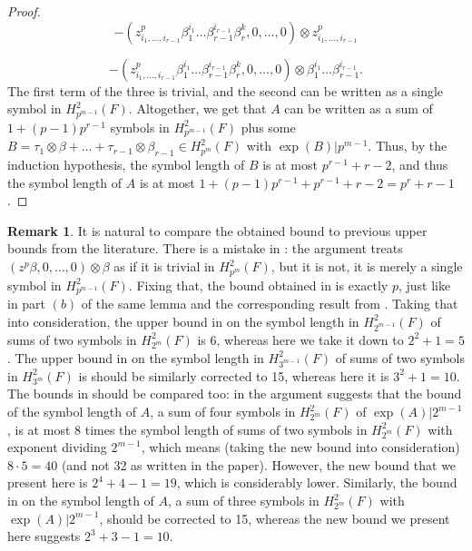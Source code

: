 \documentclass[preprint, 10pt, english]{elsarticle}
\theoremstyle{definition}
\newtheorem{rem}[thm]{Remark}
\begin{document}
\begin{proof}
$$-(z_{i_1,\dots,i_{r-1}}^p \beta_1^{i_1} \dots \beta_{r-1}^{i_{r-1}} \beta_r^k,0,\dots,0)\otimes z_{i_1,\dots,i_{r-1}}^p$$

$$-(z_{i_1,\dots,i_{r-1}}^p \beta_1^{i_1} \dots \beta_{r-1}^{i_{r-1}} \beta_r^k,0,\dots,0)\otimes \beta_1^{i_1} \dots \beta_{r-1}^{i_{r-1}}.$$
The first term of the three is trivial, and the second can be written as a single symbol in $H_{p^{m-1}}^2(F)$.
Altogether, we get that $A$ can be written as a sum of $1+(p-1)p^{r-1}$ symbols in $H_{p^{m-1}}^2(F)$ plus some  $B=\tau_1\otimes\beta+\dots+\tau_{r-1}\otimes\beta_{r-1} \in H_{p^m}^2(F)$ with $\exp(B)|p^{m-1}$. Thus, by the induction hypothesis, the symbol length of $B$ is at most $p^{r-1}+r-2$, and thus the symbol length of $A$ is at most $1+(p-1)p^{r-1}+p^{r-1}+r-2=p^r+r-1$.
\end{proof}

\begin{rem}
It is natural to compare the obtained bound to previous upper bounds from the literature. There is a mistake in \cite[Lemma 5.4 (a)]{ChapmanFlorenceMcKinnie:2023}: the argument treats $(z^p \beta,0,\dots,0)\otimes \beta$ as if it is trivial in $H_{p^m}^2(F)$, but it is not, it is merely a single symbol in $H_{p^{m-1}}^2(F)$. Fixing that, the bound obtained in \cite[Lemma 5.4 (a)]{ChapmanFlorenceMcKinnie:2023} is exactly $p$, just like in part $(b)$ of the same lemma and the corresponding result from \cite{MammoneMerkurjev:1991}. Taking that into consideration, the upper bound in \cite[Corollary 5.5 (a)]{ChapmanFlorenceMcKinnie:2023} on the symbol length in $H_{2^{m-1}}^2(F)$ of sums of two symbols in $H_{2^m}^2(F)$ is 6, whereas here we take it down to $2^2+1=5$. 
The upper bound in \cite[Corollary 5.5 (b)]{ChapmanFlorenceMcKinnie:2023} on the symbol length in $H_{3^{m-1}}^2(F)$ of sums of two symbols in $H_{3^m}^2(F)$ is should be similarly corrected to 15, whereas here it is $3^2+1=10$.
The bounds in \cite{ChapmanMcKinnie:2023} should be compared too: in \cite[Theorem 4.2]{ChapmanMcKinnie:2023} the argument suggests that the bound of the symbol length of $A$, a sum of four symbols in $H_{2^m}^2(F)$ of $\exp(A)|2^{m-1}$, is at most 8 times the symbol length of sums of two symbols in $H_{2^m}^2(F)$ with exponent dividing $2^{m-1}$, which means (taking the new bound into consideration) $8\cdot 5=40$ (and not 32 as written in the paper). However, the new bound that we present here is $2^4+4-1=19$, which is considerably lower. 
Similarly, the bound in \cite[Theorem 4.3]{ChapmanMcKinnie:2023} on the symbol length of  $A$, a sum of three symbols in $H_{2^m}^2(F)$ with $\exp(A)|2^{m-1}$, should be corrected to 15, whereas the new bound we present here suggests $2^3+3-1=10$. 
\end{rem}
\end{document}
